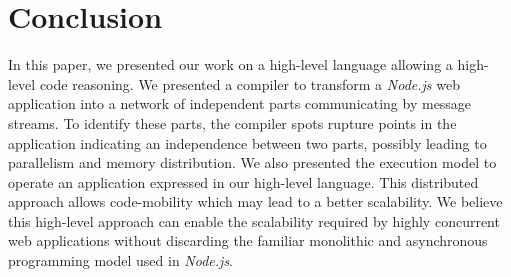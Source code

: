 \section{Conclusion} \label{section:conclusion}


In this paper, we presented our work on a high-level language allowing a high-level code reasoning.
We presented a compiler to transform a \textit{Node.js} web application into a network of independent parts communicating by message streams.
To identify these parts, the compiler spots rupture points in the application indicating an independence between two parts, possibly leading to parallelism and memory distribution.
We also presented the execution model to operate an application expressed in our high-level language.
This distributed approach allows code-mobility which may lead to a better scalability.
We believe this high-level approach can enable the scalability required by highly concurrent web applications without discarding the familiar monolithic and asynchronous programming model used in \textit{Node.js}.